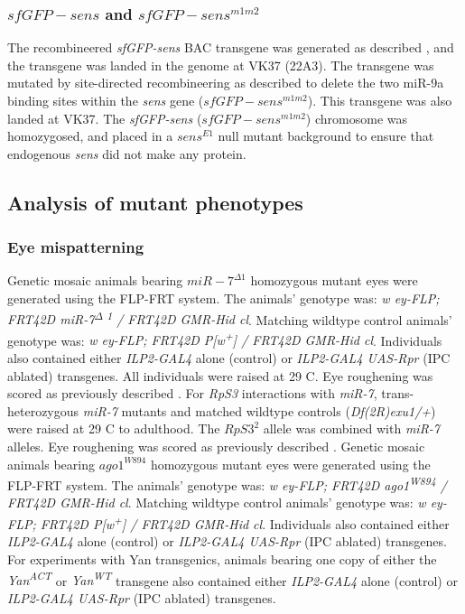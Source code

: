 \subsubsection{$sfGFP-sens$ and $sfGFP-sens^{m1m2}$}
\label{appendix:supp:metabolism:exp:sfgfp_sens}

The recombineered \textit{sfGFP-sens} BAC transgene was generated as described \cite{Cassidy2013}, and the transgene was landed in the genome at VK37 (22A3). The transgene was mutated by site-directed recombineering as described \cite{Cassidy2013} to delete the two miR-9a binding sites within the \textit{sens} gene ($sfGFP-sens^{m1m2}$). This transgene was also landed at VK37. The \textit{sfGFP-sens} ($sfGFP-sens^{m1m2}$) chromosome was homozygosed, and placed in a $sens^{E1}$ null mutant background to ensure that endogenous \textit{sens} did not make any protein.

\subsection{Analysis of mutant phenotypes}
\label{appendix:supp:metabolism:exp:phenotypes}

\subsubsection{Eye mispatterning}

Genetic mosaic animals bearing $miR-7^{\Delta 1}$ homozygous mutant eyes were generated using the FLP-FRT system. The animals' genotype was: \textit{w ey-FLP; FRT42D miR-7\textsuperscript{$\Delta$ 1} / FRT42D GMR-Hid cl}. Matching wildtype control animals' genotype was: \textit{w ey-FLP; FRT42D P{[}w\textsuperscript{+}{]} / FRT42D GMR-Hid cl}. Individuals also contained either \textit{ILP2-GAL4} alone (control) or \textit{ILP2-GAL4 UAS-Rpr} (IPC ablated) transgenes. All individuals were raised at 29 \textdegree{}C. Eye roughening was scored as previously described \cite{Li2009b}. For \textit{RpS3} interactions with \textit{miR-7}, trans-heterozygous \textit{miR-7} mutants and matched wildtype controls (\textit{Df(2R)exu1/+}) were raised at 29 \textdegree{}C to adulthood. The $RpS3^2$ allele was combined with \textit{miR-7} alleles. Eye roughening was scored as previously described \cite{Li2009b}. Genetic mosaic animals bearing $ago1^{W894}$ homozygous mutant eyes were generated using the FLP-FRT system. The animals' genotype was: \textit{w ey-FLP; FRT42D ago1\textsuperscript{W894} / FRT42D GMR-Hid cl}. Matching wildtype control animals' genotype was: \textit{w ey-FLP; FRT42D P{[}w\textsuperscript{+}{]} / FRT42D GMR-Hid cl}. Individuals also contained either \textit{ILP2-GAL4} alone (control) or \textit{ILP2-GAL4 UAS-Rpr} (IPC ablated) transgenes. For experiments with Yan transgenics, animals bearing one copy of either the \textit{Yan\textsuperscript{ACT}} or \textit{Yan\textsuperscript{WT}} \cite{Rebay1995} transgene also contained either \textit{ILP2-GAL4} alone (control) or \textit{ILP2-GAL4 UAS-Rpr} (IPC ablated) transgenes.

